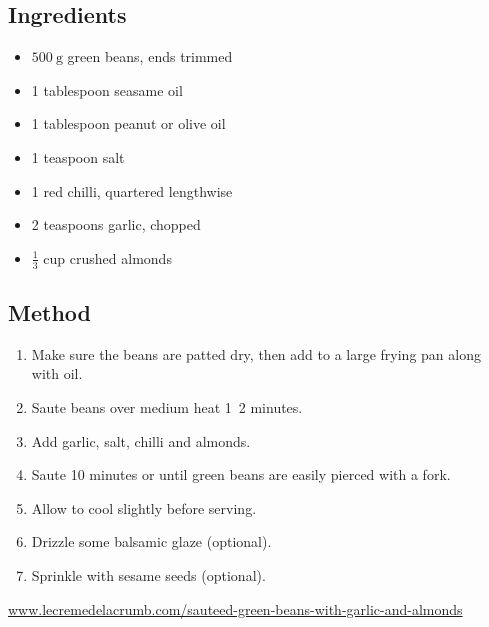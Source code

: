 \documentclass[11pt,a4paper]{article}
\begin{document}
\subsection*{Ingredients}

\begin{itemize}
  \item $ \qty{500}{\gram} $ green beans, ends trimmed
  \item 1 tablespoon seasame oil
  \item 1 tablespoon peanut or olive oil
  \item 1 teaspoon salt
  \item 1 red chilli, quartered lengthwise
  \item 2 teaspoons garlic, chopped
  \item $ \frac{1}{3} $ cup crushed almonds
\end{itemize}

\medskip

\subsection*{Method}

\begin{enumerate}
  \item Make sure the beans are patted dry, then add to a large frying pan along with oil.
  \item Saute beans over medium heat 1~2 minutes.
  \item Add garlic, salt, chilli and almonds.
  \item Saute 10 minutes or until green beans are easily pierced with a fork.
  \item Allow to cool slightly before serving.
  \item Drizzle some balsamic glaze (optional).
  \item Sprinkle with sesame seeds (optional).
\end{enumerate}

\href{https://www.lecremedelacrumb.com/sauteed-green-beans-with-garlic-and-almonds/}{www.lecremedelacrumb.com/sauteed-green-beans-with-garlic-and-almonds}
\end{document}
